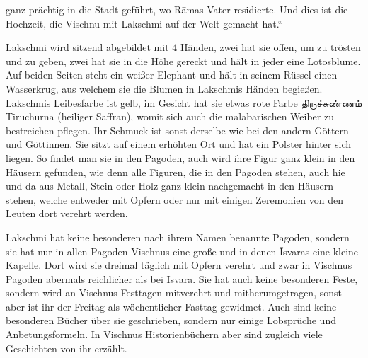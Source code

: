 \documentclass{article}
\newcommand{\TamilText}[1]{\texttamil{#1}}
\newcommand{\tam}[1]{\TamilText{#1}}
\begin{document}
ganz prächtig in die Stadt geführt, wo R\={a}mas Vater residierte. Und dies ist die Hochzeit, die Vischnu mit Lakschmi auf der Welt gemacht hat.“

Lakschmi wird sitzend abgebildet mit 4 Händen, zwei hat sie offen, um zu trösten und zu geben, zwei hat sie in die Höhe gereckt und hält in jeder eine Lotosblume. Auf beiden Seiten steht ein weißer Elephant und hält in seinem Rüssel einen Wasserkrug, aus welchem sie die Blumen in Lakschmis Händen begießen. Lakschmis Leibesfarbe ist gelb, im Gesicht hat sie etwas rote Farbe \tam{திருச்சுண்ணம்} Tiruchurna (heiliger Saffran), womit sich auch die malabarischen Weiber zu bestreichen pflegen. Ihr Schmuck ist sonst derselbe wie bei den andern Göttern und Göttinnen. Sie sitzt auf einem erhöhten Ort und hat ein Polster hinter sich liegen. So findet man sie in den Pagoden, auch wird ihre Figur ganz klein in den Häusern gefunden, wie denn alle Figuren, die in den Pagoden stehen, auch hie und da aus Metall, Stein oder Holz ganz klein nachgemacht in den Häusern stehen, welche entweder mit Opfern oder nur mit einigen Zeremonien von den Leuten dort verehrt werden.

Lakschmi hat keine besonderen nach ihrem Namen benannte Pagoden, sondern sie hat nur in allen Pagoden Vischnus eine große und in denen \={I}svaras eine kleine Kapelle. Dort wird sie dreimal täglich mit Opfern verehrt und zwar in Vischnus Pagoden abermals reichlicher als bei \={I}svara. Sie hat auch keine besonderen Feste, sondern wird an Vischnus Festtagen mitverehrt und mitherumgetragen, sonst aber ist ihr der Freitag als wöchentlicher Fasttag gewidmet. Auch sind keine besonderen Bücher über sie geschrieben, sondern nur einige Lobsprüche und Anbetungsformeln. In Vischnus Historienbüchern aber sind zugleich viele Geschichten von ihr erzählt.
\end{document}
